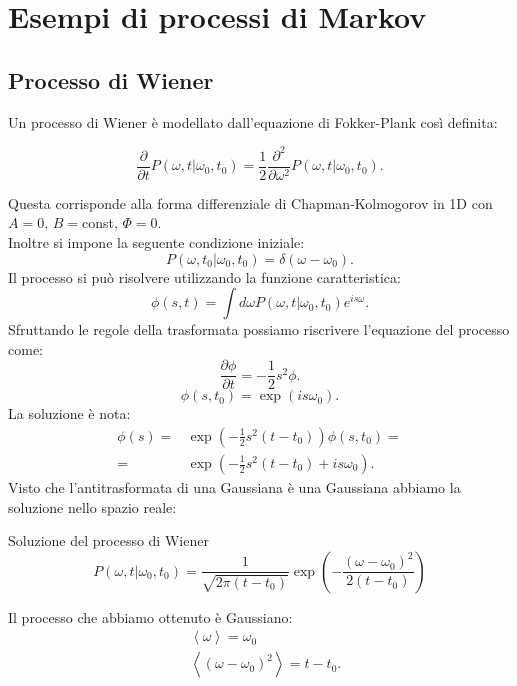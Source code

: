 \section{Esempi di processi di Markov}
\label{sub:Lezione 5}
\mylocaltoc
\subsection{Processo di Wiener}%
\label{sub:Processo di Wiener}
Un processo di Wiener è modellato dall'equazione di Fokker-Plank così definita:
\begin{greenbox}{}
    \[
	\frac{\partial }{\partial t} P(\omega,t|\omega_0, t_0) =
	\frac{1}{2}\frac{\partial ^2}{\partial \omega^2} P(\omega, t|\omega_0, t_0) 
    .\] 
\end{greenbox}
\noindent
Questa corrisponde alla forma differenziale di Chapman-Kolmogorov in 1D con $A = 0$, $B = $const, $\Phi = 0$.\\
Inoltre si impone la seguente condizione iniziale:
\[
    P(\omega,t_0|\omega_0, t_0) = \delta (\omega-\omega_0) 
.\]
Il processo si può risolvere utilizzando la funzione caratteristica:
\[
    \phi (s, t) = \int d\omega P(\omega, t|\omega_0, t_0) e^{is\omega}
.\] 
Sfruttando le regole della trasformata possiamo riscrivere l'equazione del processo come:
\[
    \frac{\partial \phi }{\partial t} = -\frac{1}{2}s^2\phi
.\] 
\[
    \phi (s, t_0) = \exp (is\omega_0) 
.\] 
La soluzione è nota:
\[\begin{aligned}
    \phi (s) =& \exp\left(-\frac{1}{2}s^2\left(t-t_0\right)\right)\phi (s,t_0)  =\\
    	=&\exp\left(-\frac{1}{2}s^2\left(t-t_0\right) + is\omega_0 \right) 
.\end{aligned}\]
Visto che l'antitrasformata di una Gaussiana è una Gaussiana abbiamo la soluzione nello spazio reale:
\begin{redbox}{Soluzione del processo di Wiener}
    \[
	P(\omega,t|\omega_0, t_0) = 
	\frac{1}{\sqrt{2\pi\left(t-t_0\right)} }
	\exp\left(- \frac{\left(\omega-\omega_0\right)^2}{2\left(t-t_0\right)}\right)
    \] 
\end{redbox}
\noindent
Il processo che abbiamo ottenuto è Gaussiano:
\begin{align}
    &\left<\omega\right> =  \omega_0 \label{eq:mean_wiener}\\
    &\left<\left(\omega-\omega_0\right)^2\right> = t- t_0 \label{eq:var_wiener}
.\end{align}
